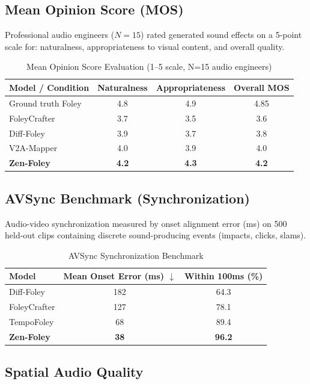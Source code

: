 \documentclass[11pt,a4paper]{article}
\begin{document}
\subsection{Mean Opinion Score (MOS)}

Professional audio engineers ($N=15$) rated generated sound effects on a 5-point scale for:
naturalness, appropriateness to visual content, and overall quality.

\begin{table}[H]
\centering
\begin{tabular}{lccc}
\toprule
\textbf{Model / Condition} & \textbf{Naturalness} & \textbf{Appropriateness} & \textbf{Overall MOS} \\
\midrule
Ground truth Foley & 4.8 & 4.9 & 4.85 \\
FoleyCrafter & 3.7 & 3.5 & 3.6 \\
Diff-Foley & 3.9 & 3.7 & 3.8 \\
V2A-Mapper & 4.0 & 3.9 & 4.0 \\
\textbf{Zen-Foley} & \textbf{4.2} & \textbf{4.3} & \textbf{4.2} \\
\bottomrule
\end{tabular}
\caption{Mean Opinion Score Evaluation (1--5 scale, N=15 audio engineers)}
\end{table}

\subsection{AVSync Benchmark (Synchronization)}

Audio-video synchronization measured by onset alignment error (ms) on 500 held-out clips
containing discrete sound-producing events (impacts, clicks, slams).

\begin{table}[H]
\centering
\begin{tabular}{lcc}
\toprule
\textbf{Model} & \textbf{Mean Onset Error (ms)} $\downarrow$ & \textbf{Within 100ms (\%)} \\
\midrule
Diff-Foley & 182 & 64.3 \\
FoleyCrafter & 127 & 78.1 \\
TempoFoley & 68 & 89.4 \\
\textbf{Zen-Foley} & \textbf{38} & \textbf{96.2} \\
\bottomrule
\end{tabular}
\caption{AVSync Synchronization Benchmark}
\end{table}

\subsection{Spatial Audio Quality}
\end{document}

